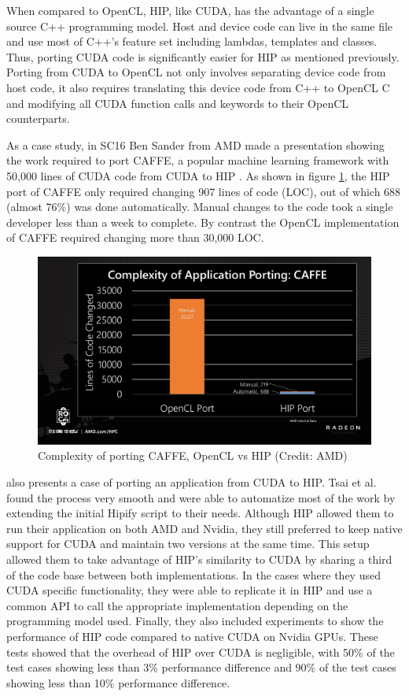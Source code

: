 When compared to OpenCL, HIP, like CUDA, has the advantage of a single source C++ programming model. Host and device code can live in the same file and use most of C++'s feature set including lambdas, templates and classes. Thus, porting CUDA code is significantly easier for HIP as mentioned previously. Porting from CUDA to OpenCL not only involves separating device code from host code, it also requires translating this device code from C++ to OpenCL C and modifying all CUDA function calls and keywords to their OpenCL counterparts.

As a case study, in SC16 Ben Sander from AMD made a presentation showing the work required to port CAFFE, a popular machine learning framework with 50,000 lines of CUDA code from CUDA to HIP \cite{caffe_rocm_port}. As shown in figure \ref{fig:caffe-rocm-port}, the HIP port of CAFFE only required changing 907 lines of code (LOC), out of which 688 (almost 76\%) was done automatically. Manual changes to the code took a single developer less than a week to complete. By contrast the OpenCL implementation of CAFFE required changing more than 30,000 LOC.

\begin{figure}[ht]
    \centering
    \includegraphics[width=\textwidth]{img/caffe-rocm-port.png}
    \captionsetup{justification=centering}
    \caption{Complexity of porting CAFFE, OpenCL vs HIP (Credit: AMD)}
    \label{fig:caffe-rocm-port}
\end{figure}

\cite{ginkgo_rocm_port} also presents a case of porting an application from CUDA to HIP. Tsai et al. found the process very smooth and were able to automatize most of the work by extending the initial Hipify script to their needs. Although HIP allowed them to run their application on both AMD and Nvidia, they still preferred to keep native support for CUDA and maintain two versions at the same time. This setup allowed them to take advantage of HIP's similarity to CUDA by sharing a third of the code base between both implementations. In the cases where they used CUDA specific functionality, they were able to replicate it in HIP and use a common API to call the appropriate implementation depending on the programming model used. Finally, they also included experiments to show the performance of HIP code compared to native CUDA on Nvidia GPUs. These tests showed that the overhead of HIP over CUDA is negligible, with 50\% of the test cases showing less than 3\% performance difference and 90\% of the test cases showing less than 10\% performance difference.

